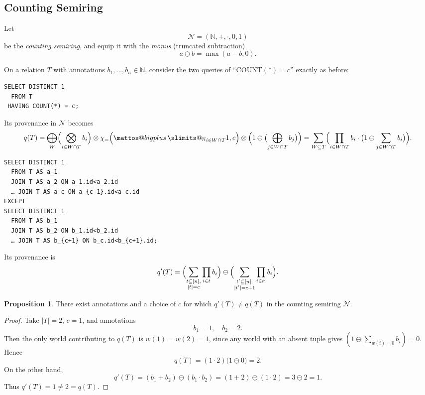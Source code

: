 \documentclass[10pt,a4paper]{scrartcl}
\makeatletter
\theoremstyle{definition}
\newtheorem{proposition}[theorem]{Proposition}
\theoremstyle{remark}
\newcommand{\bigplus}{%
  \DOTSB\mathop{\mathpalette\mattos@bigplus\relax}\slimits@
}
\newcommand\mattos@bigplus[2]{%
  \vcenter{\hbox{%
    \sbox\z@{$#1\sum$}%
    \resizebox{!}{0.9\dimexpr\ht\z@+\dp\z@}{\raisebox{\depth}{$\m@th#1+$}}%
  }}%
  \vphantom{\sum}%
}
\makeatother
\begin{document}
\subsection*{Counting Semiring}

Let
\[
  \mathcal{N} = (\mathbb{N},+,\cdot,0,1)
\]
be the \emph{counting semiring}, and equip it with the \emph{monus} (truncated subtraction)
\[
  a \ominus b =\max(a - b,0).
\]

On a relation \(T\) with annotations \(b_1,\dots,b_n\in\mathbb{N}\), consider the two queries of 
“\(\mathrm{COUNT}(*) = c\)” exactly as before:

\begin{verbatim}
SELECT DISTINCT 1
  FROM T
 HAVING COUNT(*) = c;
\end{verbatim}

Its provenance in \(\mathcal{N}\) becomes
\[
  q(T)
  =
  \bigoplus_{W}
    \Bigl(\bigotimes_{i\in W\cap T}b_i\Bigr)\otimes\chi_{=}\Bigl({\bigplus_{\mathbb{N}}}_{i\in W\cap T} 1, c\Bigr)\otimes\Bigl(1 \ominus \bigl(\bigoplus_{j\in W\cap T}b_j\bigr)\Bigr)
  =
  \sum_{W\subseteq T}
    \Bigl(\prod_{i\in W\cap T}b_i\cdot\bigl(1\ominus\sum_{j\in W\cap T}b_i\bigr)\Bigr).
\]

\begin{verbatim}
SELECT DISTINCT 1
  FROM T AS a_1
  JOIN T AS a_2 ON a_1.id<a_2.id
  … JOIN T AS a_c ON a_{c-1}.id<a_c.id
EXCEPT
SELECT DISTINCT 1
  FROM T AS b_1
  JOIN T AS b_2 ON b_1.id<b_2.id
  … JOIN T AS b_{c+1} ON b_c.id<b_{c+1}.id;
\end{verbatim}

Its provenance is
\[
  q'(T)
  =
  \Bigl(\sum_{\substack{t\subseteq[n],\\|t|=c}}\prod_{i\in t}b_i\Bigr)
  \ominus
  \Bigl(\sum_{\substack{t'\subseteq[n],\\|t'|=c+1}}\prod_{i\in t'}b_i\Bigr).
\]

\begin{proposition}
There exist annotations and a choice of \(c\) for which
\(q'(T)\neq q(T)\)
in the counting semiring \(\mathcal{N}\).
\end{proposition}

\begin{proof}
Take \(\lvert T\rvert=2\), \(c=1\), and annotations
\[
  b_1 = 1,\quad b_2 = 2.
\]
Then the only world contributing to \(q(T)\) is \(w(1)=w(2)=1\), since any world with an absent tuple gives
\((1\ominus\sum_{w(i)=0}b_i)=0\).  Hence
\[
  q(T)
  = (1\cdot2)\bigl(1\ominus0\bigr)
  = 2.
\]
On the other hand,
\[
  q'(T)
  = (b_1+b_2)\ominus(b_1\cdot b_2)
  = (1+2)\ominus(1\cdot2)
  = 3\ominus2
  = 1.
\]
Thus \(q'(T)=1\neq2=q(T)\).
\end{proof}
\end{document}
